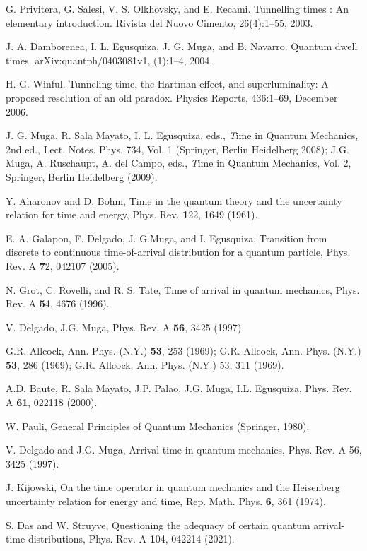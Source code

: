 \begin{thebibliography}{0}
 G. Privitera, G. Salesi, V. S. Olkhovsky, and E. Recami. Tunnelling times : An elementary introduction.
Rivista del Nuovo Cimento, 26(4):1–55, 2003.

 J. A. Damborenea, I. L. Egusquiza, J. G. Muga, and B. Navarro. Quantum dwell times. arXiv:quantph/0403081v1, (1):1–4, 2004.

 H. G. Winful. Tunneling time, the Hartman effect, and superluminality: A proposed resolution of an
old paradox. Physics Reports, 436:1–69, December 2006.

 J. G. Muga, R. Sala Mayato, I. L. Egusquiza, eds., {\textit Time in Quantum Mechanics}, 2nd ed., Lect. Notes. Phys. 734, Vol. 1 (Springer, Berlin Heidelberg 2008); J.G. Muga, A. Ruschaupt, A. del Campo, eds., {\textit Time in Quantum Mechanics}, Vol. 2, Springer, Berlin Heidelberg (2009).

 Y. Aharonov and D. Bohm, Time in the quantum theory and the uncertainty relation for time and energy, Phys. Rev. {\textbf 122}, 1649 (1961).


 E. A. Galapon, F. Delgado, J. G.Muga, and I. Egusquiza, Transition from discrete to continuous time-of-arrival distribution for a quantum particle, Phys. Rev. A {\textbf 72}, 042107 (2005).

 N. Grot, C. Rovelli, and R. S. Tate, Time of arrival in quantum mechanics, Phys. Rev. A {\textbf 54}, 4676 (1996).


 V. Delgado, J.G. Muga, Phys. Rev. A \textbf{56}, 3425 (1997).


 G.R. Allcock, Ann. Phys. (N.Y.) \textbf{53}, 253 (1969); G.R. Allcock,
Ann. Phys. (N.Y.) \textbf{53},  286 (1969); G.R. Allcock, Ann. Phys.
(N.Y.) 53, 311 (1969).


 A.D. Baute, R. Sala Mayato, J.P. Palao, J.G. Muga, I.L.
Egusquiza, Phys. Rev. A \textbf{61}, 022118 (2000).


 W. Pauli, General Principles of Quantum Mechanics (Springer, 1980).

 V. Delgado and J.G. Muga, Arrival time in quantum mechanics, Phys. Rev. A 56, 3425 (1997).


 J. Kijowski, On the time operator in quantum mechanics and the Heisenberg uncertainty relation for energy and time, Rep. Math. Phys. {\textbf 6}, 361 (1974).


 S. Das and W. Struyve, Questioning the adequacy of certain quantum arrival-time distributions, Phys. Rev. A {\textbf 104}, 042214 (2021).



\end{thebibliography}
